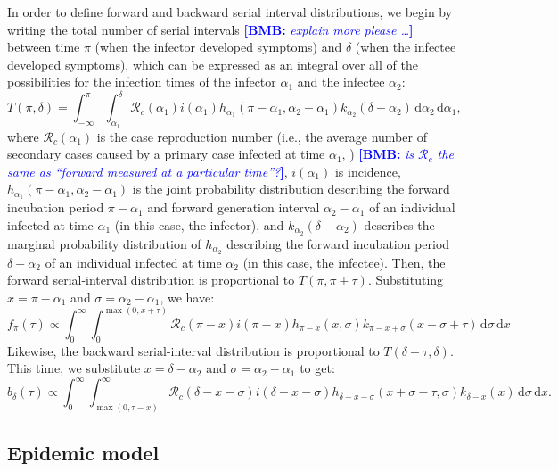 \documentclass[12pt]{article}
\newcommand{\comment}{\showcomment}
\newcommand{\showcomment}[3]{\textcolor{#1}{\textbf{[#2: }\textsl{#3}\textbf{]}}}
\newcommand{\bmb}[1]{\comment{blue}{BMB}{#1}}
\newcommand{\Rx}[1]{\ensuremath{{\mathcal R}_{#1}}\xspace}
\newcommand{\Rc}{\Rx{c}}
\newcommand{\dd}[1]{\ensuremath{\, \mathrm{d}#1}}
\newcommand{\dx}{\dd{x}}
\newcommand{\dsigma}{\dd{\sigma}}
\begin{document}
In order to define forward and backward serial interval distributions, we begin by writing the total number of serial intervals \bmb{explain more please \ldots} between time $\pi$ (when the infector developed symptoms) and $\delta$ (when the infectee developed symptoms), which can be expressed as an integral over all of the possibilities for the infection times of the infector $\alpha_1$ and the infectee $\alpha_2$:
\begin{equation}
T(\pi,\delta) = \int_{-\infty}^{\pi} \int_{\alpha_1}^{\delta} \Rc (\alpha_1) i(\alpha_1) h_{\alpha_1}(\pi-\alpha_1, \alpha_2 - \alpha_1) k_{\alpha_2}(\delta - \alpha_2) \, \mathrm{d}\alpha_2\,\mathrm{d}\alpha_1,
\end{equation}
where $\Rc(\alpha_1)$ is the case reproduction number (i.e., the average number of secondary cases caused by a primary case infected at time $\alpha_1$, \cite{fraser2007estimating}) \bmb{is \Rc the same as ``forward \R measured at a particular time''?}, $i(\alpha_1)$ is incidence, $h_{\alpha_1}(\pi-\alpha_1, \alpha_2 - \alpha_1)$ is the joint probability distribution describing the forward incubation period $\pi-\alpha_1$ and forward generation interval $\alpha_2 - \alpha_1$ of an individual infected at time $\alpha_1$ (in this case, the infector), and $k_{\alpha_2}(\delta-\alpha_2)$ describes the marginal probability distribution of $h_{\alpha_2}$ describing the forward incubation period $\delta-\alpha_2$ of an individual infected at time $\alpha_2$ (in this case, the infectee). 
Then, the forward serial-interval distribution is proportional to $T(\pi, \pi+\tau)$. Substituting $x=\pi-\alpha_1$ and $\sigma=\alpha_2-\alpha_1$, we have:
\begin{equation}
f_\pi(\tau) \propto \int_{0}^{\infty} \int_{0}^{\max(0,x+\tau)} \Rc (\pi-x) i(\pi-x) h_{\pi-x}(x, \sigma) k_{\pi-x+\sigma}(x-\sigma+\tau) \dsigma \dx
\end{equation}
Likewise, the backward serial-interval distribution is proportional to $T(\delta-\tau, \delta)$. 
This time, we substitute $x=\delta-\alpha_2$ and $\sigma=\alpha_2-\alpha_1$ to get:
\begin{equation}
b_\delta(\tau) \propto \int_{0}^{\infty} \int_{\max(0, \tau-x)}^{\infty} \Rc (\delta-x-\sigma) i(\delta-x-\sigma) h_{\delta-x-\sigma}(x+\sigma-\tau, \sigma) k_{\delta-x}(x) \dsigma \dx.
\end{equation}

\subsection{Epidemic model}
\end{document}
